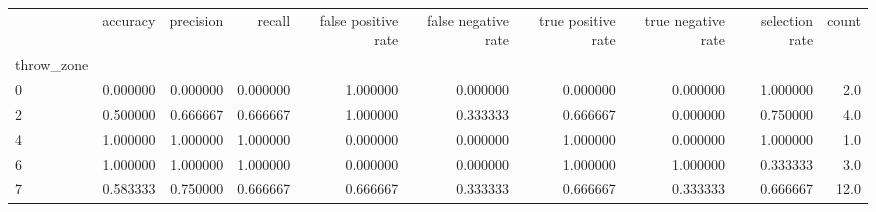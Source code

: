 \begin{tabular}{lrrrrrrrrr}
\toprule
{} &  accuracy &  precision &    recall &  false positive rate &  false negative rate &  true positive rate &  true negative rate &  selection rate &  count \\
throw\_zone &           &            &           &                      &                      &                     &                     &                 &        \\
\midrule
0          &  0.000000 &   0.000000 &  0.000000 &             1.000000 &             0.000000 &            0.000000 &            0.000000 &        1.000000 &    2.0 \\
2          &  0.500000 &   0.666667 &  0.666667 &             1.000000 &             0.333333 &            0.666667 &            0.000000 &        0.750000 &    4.0 \\
4          &  1.000000 &   1.000000 &  1.000000 &             0.000000 &             0.000000 &            1.000000 &            0.000000 &        1.000000 &    1.0 \\
6          &  1.000000 &   1.000000 &  1.000000 &             0.000000 &             0.000000 &            1.000000 &            1.000000 &        0.333333 &    3.0 \\
7          &  0.583333 &   0.750000 &  0.666667 &             0.666667 &             0.333333 &            0.666667 &            0.333333 &        0.666667 &   12.0 \\
\bottomrule
\end{tabular}
